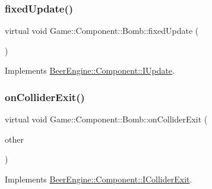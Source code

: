 \mbox{\label{class_game_1_1_component_1_1_bomb_af6598c095c2f36a2a1b1048eb84d6fc7}} 
\subsubsection{\texorpdfstring{fixed\+Update()}{fixedUpdate()}}
{\footnotesize\ttfamily virtual void Game\+::\+Component\+::\+Bomb\+::fixed\+Update (\begin{DoxyParamCaption}\item[{void}]{ }\end{DoxyParamCaption})\hspace{0.3cm}{\ttfamily [virtual]}}



Implements \mbox{\hyperlink{class_beer_engine_1_1_component_1_1_i_update_a615c127a4729f73713e5eaeee538854b}{Beer\+Engine\+::\+Component\+::\+I\+Update}}.

\mbox{\label{class_game_1_1_component_1_1_bomb_a73e1089e8b6be42c0357beda3ab6ccfa}} 
\subsubsection{\texorpdfstring{on\+Collider\+Exit()}{onColliderExit()}}
{\footnotesize\ttfamily virtual void Game\+::\+Component\+::\+Bomb\+::on\+Collider\+Exit (\begin{DoxyParamCaption}\item[{\mbox{\hyperlink{class_beer_engine_1_1_component_1_1_a_collider}{Beer\+Engine\+::\+Component\+::\+A\+Collider}} $\ast$}]{other }\end{DoxyParamCaption})\hspace{0.3cm}{\ttfamily [virtual]}}



Implements \mbox{\hyperlink{class_beer_engine_1_1_component_1_1_i_collider_exit_a3669477d0003535fbe0411449efc69e9}{Beer\+Engine\+::\+Component\+::\+I\+Collider\+Exit}}.

\mbox{\label{class_game_1_1_component_1_1_bomb_a3432430350d557ef1b7d9ac0339b659a}} 
